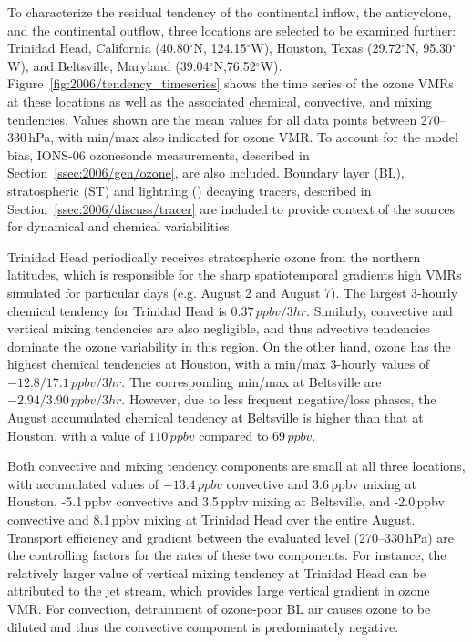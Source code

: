 To characterize the residual tendency of the continental inflow, the anticyclone, and the continental outflow, three locations are selected to be
examined further: Trinidad Head, California (40.80$^\circ$N, 124.15$^\circ$W), Houston, Texas (29.72$^\circ$N, 95.30$^\circ$W),
and Beltsville, Maryland (39.04$^\circ$N,76.52$^\circ$W). Figure~\ref{fig:2006/tendency_timeseries} shows the time series of the
ozone VMRs at these locations as well as the associated chemical, convective, and mixing tendencies. Values shown are the mean values for
all data points between 270--330\,\unit{hPa}, with min/max also indicated for ozone VMR.
To account for the model bias, IONS-06 ozonesonde measurements, described in Section~\ref{ssec:2006/gen/ozone}, are also included.
Boundary layer (BL), stratospheric (ST) and lightning (\lnox) decaying tracers, described in Section~\ref{ssec:2006/discuss/tracer}
are included to provide context of the sources for dynamical and chemical variabilities.

Trinidad Head periodically receives stratospheric ozone from the northern latitudes, which is responsible for the sharp spatiotemporal gradients
high VMRs simulated for particular days (e.g. August 2 and August 7). The largest 3-hourly chemical tendency for Trinidad Head is
$0.37\,\unit{ppbv/3 hr}$. Similarly, convective and vertical mixing tendencies are also negligible, and thus advective tendencies dominate
the ozone variability in this region. On the other hand, ozone has the highest chemical tendencies at Houston, with a min/max 3-hourly values of
$-12.8/17.1\,\unit{ppbv/3 hr}$. The corresponding min/max at Beltsville are $-2.94/3.90\,\unit{ppbv/3 hr}$. However, due to less frequent
negative/loss phases, the August accumulated chemical tendency at Beltsville is higher than that at Houston, with a value of $110\,\unit{ppbv}$
compared to $69\,\unit{ppbv}$. 

Both convective and mixing tendency components are small at all three locations, with accumulated values of $-13.4\,\unit{ppbv}$ convective
and 3.6\,\unit{ppbv} mixing at Houston, -5.1\,\unit{ppbv} convective and 3.5\,\unit{ppbv} mixing at Beltsville, and -2.0\,\unit{ppbv} convective and
8.1\,\unit{ppbv} mixing at Trinidad Head over the entire August. Transport efficiency and gradient between the evaluated level (270--330\,\unit{hPa}) are the controlling
factors for the rates of these two components. For instance, the relatively larger value of vertical mixing tendency at Trinidad Head can be
attributed to the jet stream, which provides large vertical gradient in ozone VMR. For convection, detrainment of ozone-poor BL
air causes ozone to be diluted and thus the convective component is predominately negative.

